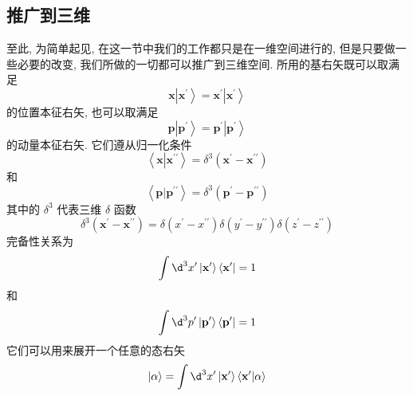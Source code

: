\subsection{推广到三维}
至此, 为简单起见, 在这一节中我们的工作都只是在一维空间进行的, 但是只要做一些必要的改变, 我们所做的一切都可以推广到三维空间. 所用的基右矢既可以取满足
\begin{equation}
	\mathbf{x}\left| {\mathbf{x}}^{\prime }\right\rangle = {\mathbf{x}}^{\prime }\left| {\mathbf{x}}^{\prime }\right\rangle
\end{equation}
的位置本征右矢, 也可以取满足
\begin{equation}
	\mathbf{p}\left| {\mathbf{p}}^{\prime }\right\rangle = {\mathbf{p}}^{\prime }\left| {\mathbf{p}}^{\prime }\right\rangle
\end{equation}
的动量本征右矢. 它们遵从归一化条件
\begin{equation}
	\left\langle\mathbf{x}\left| {\mathbf{x}}^{\prime \prime }\right\rangle = {\delta }^{3}\left( {{\mathbf{x}}^{\prime } - {\mathbf{x}}^{\prime \prime }}\right)
\end{equation}
和
\begin{equation}
	\left\langle {\mathbf{p} | {\mathbf{p}}^{\prime \prime }}\right\rangle = {\delta }^{3}\left( {{\mathbf{p}}^{\prime } - {\mathbf{p}}^{\prime \prime }}\right)
\end{equation}
其中的 ${\delta }^{3}$ 代表三维 $\delta$ 函数
\begin{equation}
	{\delta }^{3}\left( {{\mathbf{x}}^{\prime } - {\mathbf{x}}^{\prime \prime }}\right) = \delta \left( {{x}^{\prime } - {x}^{\prime \prime }}\right) \delta \left( {{y}^{\prime } - {y}^{\prime \prime }}\right) \delta \left( {{z}^{\prime } - {z}^{\prime \prime }}\right)
\end{equation}
完备性关系为
\begin{equation}
	\int {\d}^{3}{x}^{\prime }\left| {\mathbf{x}}^{\prime }\right\rangle \left\langle {\mathbf{x}}^{\prime }\right| = 1
\end{equation}
和
\begin{equation}
	\int {\d}^{3}{p}^{\prime }\left| {\mathbf{p}}^{\prime }\right\rangle \left\langle {\mathbf{p}}^{\prime }\right| = 1
\end{equation}
它们可以用来展开一个任意的态右矢
\begin{equation}
	|\alpha \rangle = \int {\d}^{3}{x}^{\prime }\left| {\mathbf{x}}^{\prime }\right\rangle \left\langle {{\mathbf{x}}^{\prime } | \alpha }\right\rangle
\end{equation}
